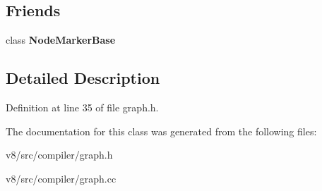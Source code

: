 \subsection*{Friends}
\begin{DoxyCompactItemize}
\item 
\mbox{\label{classv8_1_1internal_1_1compiler_1_1Graph_a300aff091dd808ac2a77b73336b03672}} 
class {\bfseries Node\+Marker\+Base}
\end{DoxyCompactItemize}


\subsection{Detailed Description}


Definition at line 35 of file graph.\+h.



The documentation for this class was generated from the following files\+:\begin{DoxyCompactItemize}
\item 
v8/src/compiler/graph.\+h\item 
v8/src/compiler/graph.\+cc\end{DoxyCompactItemize}
